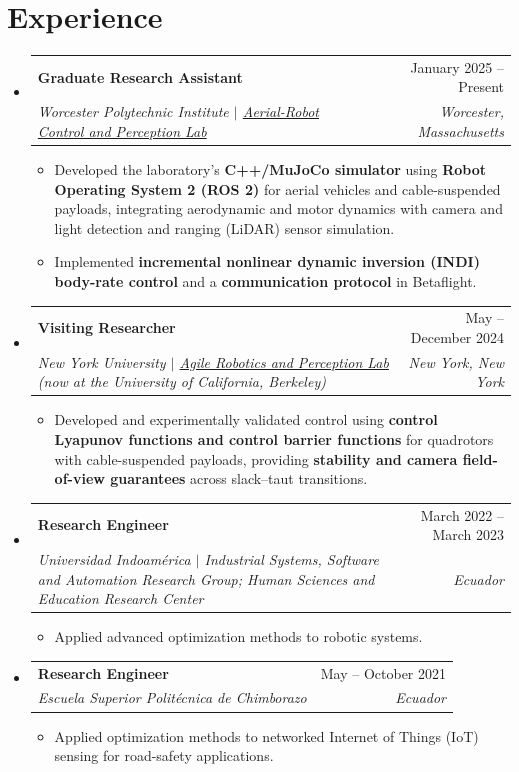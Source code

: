 \documentclass[letterpaper,11pt]{article}
\makeatletter
\newcommand{\resumeItem}[1]{
  \item {\small #1\par}\vspace{-2pt}
}
\newcommand{\resumeSubheading}[4]{
  \vspace{-2pt}\item
    \begin{tabularx}{0.97\textwidth}[t]{@{}X@{\hspace{10pt}}r@{}}
      \textbf{#1} & #2 \\
      \textit{\small#3} & \textit{\small #4} \\
    \end{tabularx}\vspace{-7pt}
}
\newcommand{\resumeSubHeadingListStart}{\begin{itemize}[leftmargin=0.15in, label={}, itemsep=6pt, topsep=3pt, parsep=0pt]}
\newcommand{\resumeSubHeadingListEnd}{\end{itemize}}
\newcommand{\resumeItemListStart}{\begin{itemize}}
\newcommand{\resumeItemListEnd}{\end{itemize}\vspace{-5pt}}
\makeatother
\begin{document}
\section{Experience}
\resumeSubHeadingListStart
\resumeSubheading{Graduate Research Assistant}{January 2025 -- Present}
{Worcester Polytechnic Institute $|$ \href{https://acp-lab.github.io/acplab-web/}{Aerial-Robot Control and Perception Lab}}{Worcester, Massachusetts}
\resumeItemListStart
\resumeItem{Developed the laboratory's \textbf{C++/MuJoCo simulator} using \textbf{Robot Operating System 2 (ROS 2)} for aerial vehicles and cable-suspended payloads, integrating aerodynamic and motor dynamics with camera and light detection and ranging (LiDAR) sensor simulation.}
\resumeItem{Implemented \textbf{incremental nonlinear dynamic inversion (INDI) body-rate control} and a \textbf{communication protocol} in Betaflight.}
\resumeItemListEnd
\resumeSubheading{Visiting Researcher}{May -- December 2024}
{New York University $|$ \href{https://arplaboratory.github.io/}{Agile Robotics and Perception Lab} (now at the University of California, Berkeley)}{New York, New York}
\resumeItemListStart
\resumeItem{Developed and experimentally validated control using \textbf{control Lyapunov functions and control barrier functions} for quadrotors with cable-suspended payloads, providing \textbf{stability and camera field-of-view guarantees} across slack--taut transitions.}
\resumeItemListEnd
\resumeSubheading{Research Engineer}{March 2022 -- March 2023}
{Universidad Indoam\'erica $|$ Industrial Systems, Software and Automation Research Group; Human Sciences and Education Research Center}{Ecuador}
\resumeItemListStart
\resumeItem{Applied advanced optimization methods to robotic systems.}
\resumeItemListEnd
\resumeSubheading{Research Engineer}{May -- October 2021}
{Escuela Superior Polit\'ecnica de Chimborazo}{Ecuador}
\resumeItemListStart
\resumeItem{Applied optimization methods to networked Internet of Things (IoT) sensing for road-safety applications.}
\resumeItemListEnd
\resumeSubHeadingListEnd
\end{document}
